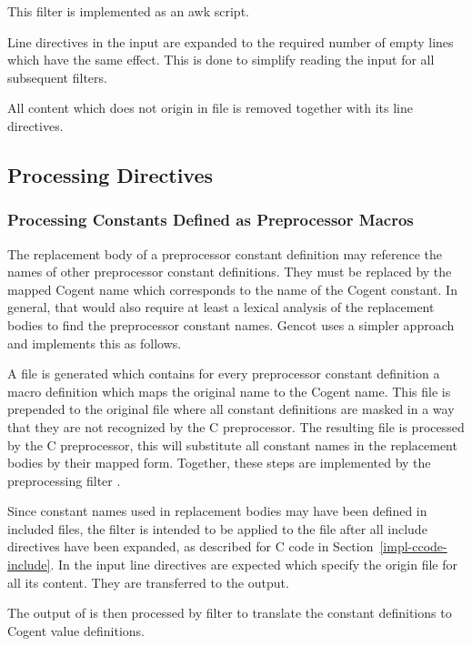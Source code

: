 This filter is implemented as an awk script.

Line directives in the input are expanded to the required number of empty lines
which have the same effect. This is done to simplify reading the input for all subsequent filters.

All content which does not origin in file  is removed together with its line directives.

\subsection{Processing Directives}
\label{impl-preprocessor-process}

\subsubsection{Processing Constants Defined as Preprocessor Macros}

The replacement body of a preprocessor constant definition may reference the names of other preprocessor
constant definitions. They must be replaced by the mapped Cogent name which corresponds to the name of
the Cogent constant. In general, that would also require at least a lexical analysis of the replacement
bodies to find the preprocessor constant names. Gencot uses a simpler approach and implements this as follows.

A file is generated which contains for every preprocessor constant definition a macro definition 
which maps the original name to the Cogent name. This file is prepended to the original file where all
constant definitions are masked in a way that they are not recognized by the C preprocessor.
The resulting file is processed by the C preprocessor, this will substitute all constant names in the replacement 
bodies by their mapped form. Together, these steps are implemented by the preprocessing filter 
.

Since constant names used in replacement bodies may have been defined in included files, the filter
 is intended to be applied to the file after all include directives have been 
expanded, as described for C code in Section~\ref{impl-ccode-include}. In the input line directives
are expected which specify the origin file for all its content. They are transferred to the output.

The output of  is then processed by
filter  to translate the constant definitions to Cogent value definitions.

